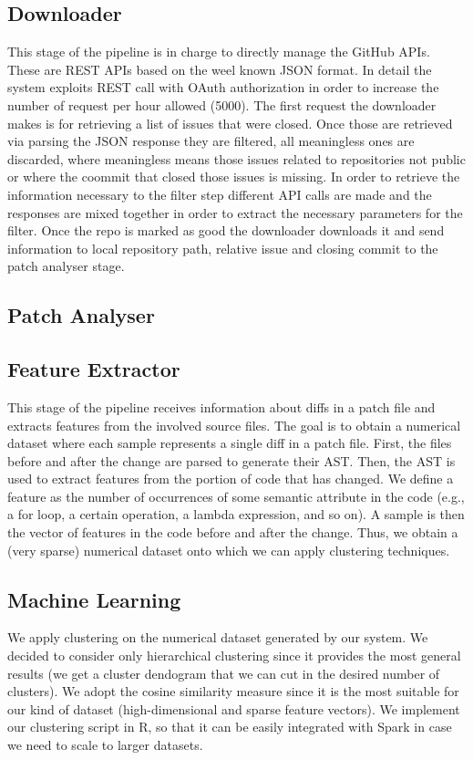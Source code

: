 \subsection{Downloader}
This stage of the pipeline is in charge to directly manage the GitHub APIs. These are REST APIs based on the weel known JSON format. In detail the system exploits REST call with OAuth authorization in order to increase the number of request per hour allowed (5000). The first request the downloader makes is for retrieving a list of issues that were closed. Once those are retrieved via parsing the JSON response they are filtered, all meaningless ones are discarded, where meaningless means those issues related to repositories not public or where the coommit that closed those issues is missing. In order to retrieve the information necessary to the filter step different API calls are made and the responses are mixed together in order to extract the necessary parameters for the filter. Once the repo is marked as good the downloader downloads it and send information to local repository path, relative issue and closing commit to the patch analyser stage. 
\subsection{Patch Analyser}
\subsection{Feature Extractor}
This stage of the pipeline receives information about diffs in a patch file and extracts features from the involved source files. The goal is to obtain a numerical dataset where each sample represents a single diff in a patch file. First, the files before and after the change are parsed to generate their AST. Then, the AST is used to extract features from the portion of code that has changed. We define a feature as the number of occurrences of some semantic attribute in the code (e.g., a for loop, a certain operation, a lambda expression, and so on). A sample is then the vector of features in the code before and after the change. Thus, we obtain a (very sparse) numerical dataset onto which we can apply clustering techniques. 
\subsection{Machine Learning} 
We apply clustering on the numerical dataset generated by our system. We decided to consider only hierarchical clustering since it provides the most general results (we get a cluster dendogram that we can cut in the desired number of clusters). We adopt the cosine similarity measure since it is the most suitable for our kind of dataset (high-dimensional and sparse feature vectors). We implement our clustering script in R, so that it can be easily integrated with Spark in case we need to scale to larger datasets.